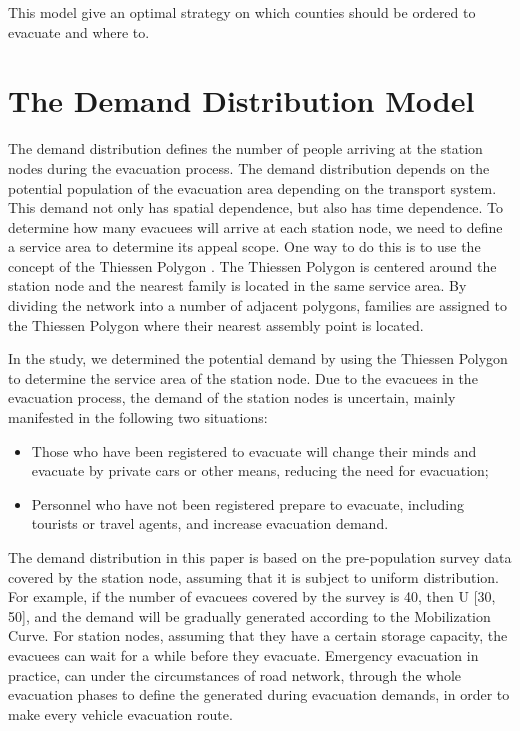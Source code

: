 \documentclass{mcmthesis}
\begin{document}
This model give an optimal strategy on which counties should be ordered to evacuate and where to.



\section{The Demand Distribution Model}

The demand distribution defines the number of people arriving at the station nodes during the evacuation process. The demand distribution depends on the potential population of the evacuation area depending on the transport system. This demand not only has spatial dependence, but also has time dependence. To determine how many evacuees will arrive at each station node, we need to define a service area to determine its appeal scope. One way to do this is to use the concept of the Thiessen Polygon \cite{Bretschneider2011A}. The Thiessen Polygon is centered around the station node and the nearest family is located in the same service area. By dividing the network into a number of adjacent polygons, families are assigned to the Thiessen Polygon where their nearest assembly point is located.

In the study, we determined the potential demand by using the Thiessen Polygon to determine the service area of the station node. Due to the evacuees in the evacuation process, the demand of the station nodes is uncertain, mainly manifested in the following two situations:

\begin{itemize}

\item Those who have been registered to evacuate will change their minds and evacuate by private cars or other means, reducing the need for evacuation;
\item Personnel who have not been registered prepare to evacuate, including tourists or travel agents, and increase evacuation demand.

\end{itemize}

The demand distribution in this paper is based on the pre-population survey data covered by the station node, assuming that it is subject to uniform distribution. For example, if the number of evacuees covered by the survey is 40, then U [30, 50], and the demand will be gradually generated according to the Mobilization Curve.
For station nodes, assuming that they have a certain storage capacity, the evacuees can wait for a while before they evacuate. Emergency evacuation in practice, can under the circumstances of road network, through the whole evacuation phases to define the generated during evacuation demands, in order to make every vehicle evacuation route.
\end{document}
